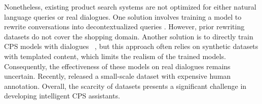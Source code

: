 

%

Nonetheless, existing product search systems are not optimized for either natural language queries or real dialogues. One solution involves training
a model to rewrite conversations into decontextualized queries \cite{yu2020few, wu2022conqrr}. %
However, prior rewriting datasets do not cover the shopping domain. 
Another solution is to directly train CPS models with dialogues %
~\cite{zhang2018towards,bi2019conversational,zou2022learning}, but this approach often relies on synthetic datasets with templated content, which limits the realism of the trained models. Consequently, the effectiveness of these models on real dialogues remains uncertain. Recently, \citet{Bernard:2023:SIGIR} released a small-scale dataset with expensive human annotation. 
Overall, the scarcity of datasets presents a significant challenge in developing intelligent CPS assistants.




